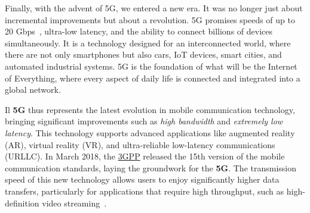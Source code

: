 \documentclass[english]{article}
\begin{document}
Finally, with the advent of 5G, we entered a new era. It was no longer just
about incremental improvements but about a revolution. 5G promises speeds of up
to 20 Gbps~\cite{javid20225g}, ultra-low latency, and the ability to connect
billions of devices simultaneously. It is a technology designed for an
interconnected world, where there are not only smartphones but also cars, IoT
devices, smart cities, and automated industrial systems. 5G is the foundation
of what will be the Internet of Everything, where every aspect of daily life is
connected and integrated into a global network.

Il \textbf{5G} thus represents the latest evolution in mobile communication
technology, bringing significant improvements such as \textit{high bandwidth}
and \textit{extremely low latency}. This technology supports advanced
applications like augmented reality (AR), virtual reality (VR), and
ultra-reliable low-latency communications (URLLC). In March 2018, the
\href{https://www.3gpp.org/technologies/5g-system-overview}{3GPP} released the
15th version of the mobile communication standards, laying the groundwork for
the \textbf{5G}. The transmission speed of this new technology allows users to
enjoy significantly higher data transfers, particularly for applications that
require high throughput, such as high-definition video
streaming~\cite{javid20225g}.
\end{document}
